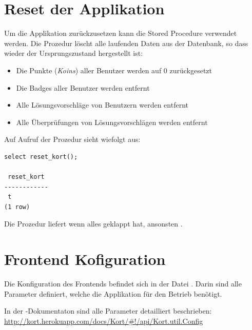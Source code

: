 \section{Reset der Applikation}
\label{kort-reset}
Um die Applikation zurückzusetzen kann die Stored Procedure  verwendet werden. 
Die Prozedur löscht alle laufenden Daten aus der Datenbank, so dass wieder der Ursprungszustand hergestellt ist:
\begin{itemize}
\item Die Punkte (\emph{Koins}) aller Benutzer werden auf 0 zurückgesetzt
\item Die Badges aller Benutzer werden entfernt
\item Alle Lösungsvorschläge von Benutzern werden entfernt
\item Alle Überprüfungen von Lösungsvorschlägen werden entfernt
\end{itemize}

Auf Aufruf der Prozedur sieht wiefolgt aus:
\begin{lstlisting}[float, caption=Aufruf von reset\_kort() um die Applikation zurückzusetzen, label=kort-reset-cmd]
select reset_kort();

 reset_kort 
------------
 t
(1 row)
\end{lstlisting}

Die Prozedur liefert  wenn alles geklappt hat, ansonsten .

\section{Frontend Kofiguration}
\label{frontend-config}
Die Konfiguration des Frontends befindet sich in der Datei .
Darin sind alle Parameter definiert, welche die Applikation für den Betrieb benötigt.

In der \kort-Dokumentaton sind alle Parameter detailliert beschrieben: \url{http://kort.herokuapp.com/docs/Kort/#!/api/Kort.util.Config}